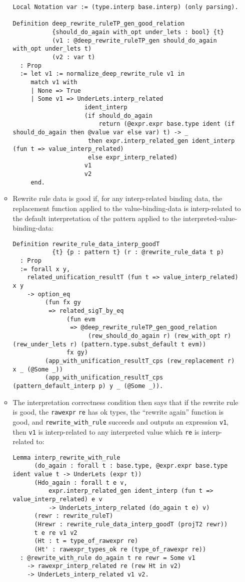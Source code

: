 \begin{itemize}
\begin{itemize}
\begin{verbatim}
Local Notation var := (type.interp base.interp) (only parsing).

Definition deep_rewrite_ruleTP_gen_good_relation
           {should_do_again with_opt under_lets : bool} {t}
           (v1 : @deep_rewrite_ruleTP_gen should_do_again with_opt under_lets t)
           (v2 : var t)
  : Prop
  := let v1 := normalize_deep_rewrite_rule v1 in
     match v1 with
     | None => True
     | Some v1 => UnderLets.interp_related
                    ident_interp
                    (if should_do_again
                        return (@expr.expr base.type ident (if should_do_again then @value var else var) t) -> _
                     then expr.interp_related_gen ident_interp (fun t => value_interp_related)
                     else expr_interp_related)
                    v1
                    v2
     end.
\end{verbatim}
  \item
    Rewrite rule data is good if, for any interp-related binding data,
    the replacement function applied to the value-binding-data is
    interp-related to the default interpretation of the pattern applied
    to the interpreted-value-binding-data:

\begin{verbatim}
Definition rewrite_rule_data_interp_goodT
           {t} {p : pattern t} (r : @rewrite_rule_data t p)
  : Prop
  := forall x y,
    related_unification_resultT (fun t => value_interp_related) x y
    -> option_eq
         (fun fx gy
          => related_sigT_by_eq
               (fun evm
                => @deep_rewrite_ruleTP_gen_good_relation
                     (rew_should_do_again r) (rew_with_opt r) (rew_under_lets r) (pattern.type.subst_default t evm))
               fx gy)
         (app_with_unification_resultT_cps (rew_replacement r) x _ (@Some _))
         (app_with_unification_resultT_cps (pattern_default_interp p) y _ (@Some _)).
\end{verbatim}
  \item
    The interpretation correctness condition then says that if the
    rewrite rule is good, the \texttt{rawexpr} \texttt{re} has ok types,
    the ``rewrite again'' function is good, and
    \texttt{rewrite\_with\_rule} succeeds and outputs an expression
    \texttt{v1}, then \texttt{v1} is interp-related to any interpreted
    value which \texttt{re} is interp-related to:

\begin{verbatim}
Lemma interp_rewrite_with_rule
      (do_again : forall t : base.type, @expr.expr base.type ident value t -> UnderLets (expr t))
      (Hdo_again : forall t e v,
          expr.interp_related_gen ident_interp (fun t => value_interp_related) e v
          -> UnderLets_interp_related (do_again t e) v)
      (rewr : rewrite_ruleT)
      (Hrewr : rewrite_rule_data_interp_goodT (projT2 rewr))
      t e re v1 v2
      (Ht : t = type_of_rawexpr re)
      (Ht' : rawexpr_types_ok re (type_of_rawexpr re))
  : @rewrite_with_rule do_again t re rewr = Some v1
    -> rawexpr_interp_related re (rew Ht in v2)
    -> UnderLets_interp_related v1 v2.
\end{verbatim}


\end{itemize}
\end{itemize}
